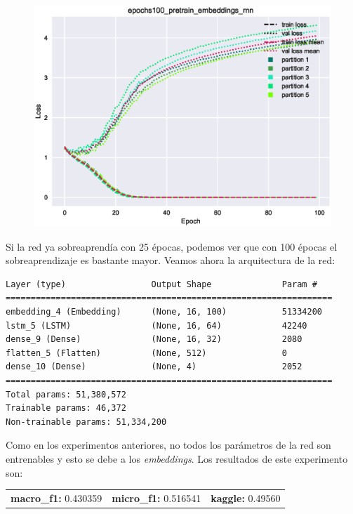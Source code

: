 \documentclass[11pt]{article}
\begin{document}
\begin{figure}[H]
\includegraphics[width=\linewidth]{images/loss/epochs100_pretrain_embeddings_rnn-1554204046.eps}
\end{figure}

Si la red ya sobreaprendía con 25 épocas, podemos ver que con 100 épocas el sobreaprendizaje es bastante mayor. Veamos ahora la arquitectura de la red:

\begin{verbatim}
Layer (type)                 Output Shape              Param #   
=================================================================
embedding_4 (Embedding)      (None, 16, 100)           51334200  
lstm_5 (LSTM)                (None, 16, 64)            42240     
dense_9 (Dense)              (None, 16, 32)            2080      
flatten_5 (Flatten)          (None, 512)               0         
dense_10 (Dense)             (None, 4)                 2052      
=================================================================
Total params: 51,380,572
Trainable params: 46,372
Non-trainable params: 51,334,200
\end{verbatim}

Como en los experimentos anteriores, no todos los parámetros de la red son entrenables y esto se debe a los \textit{embeddings}. Los resultados de este experimento son: 

\begin{table}[H]
\begin{tabular}{c|c|c}
\textbf{macro\_f1:} 0.430359 & \textbf{micro\_f1:} 0.516541 & \textbf{kaggle:} 0.49560
\end{tabular}
\end{table}
\end{document}
